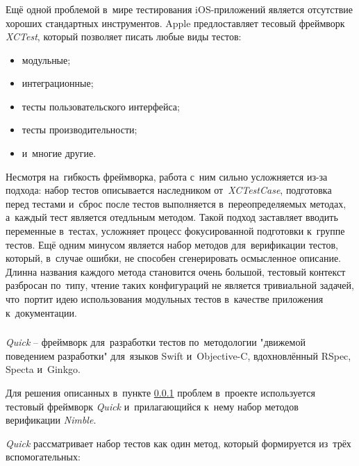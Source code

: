 \subsubsection{}
\label{sec:testing:tech:xctest}

Ещё одной проблемой в~мире тестирования iOS-приложений является отсутствие хороших стандартных инструментов. Apple предлоставляет тесовый фреймворк \textit{XCTest}, который позволяет писать любые виды тестов:

\begin{itemize}
	\item модульные;
	\item интеграционные;
	\item тесты пользовательского интерфейса;
	\item тесты производительности;
	\item и~многие другие.
\end{itemize}

Несмотря на~гибкость фреймворка, работа с~ним сильно усложняется из-за подхода: набор тестов описывается наследником от~\textit{XCTestCase}, подготовка перед тестами и~сброс после тестов выполняется в~переопределяемых методах, а~каждый тест является отедльным методом. Такой подход заставляет вводить переменные в~тестах, усложняет процесс фокусированной подготовки к~группе тестов. Ещё одним минусом является набор методов для~верификации тестов, который, в~случае ошибки, не способен сгенерировать осмысленное описание. Длинна названия каждого метода становится очень большой, тестовый контекст разбросан по~типу, чтение таких конфигураций не является тривиальной задачей, что~портит идею использования модульных тестов в~качестве приложения к~документации.

\subsubsection{}
\label{sec:testing:tech:quick}
\textit{Quick} -- фреймворк для~разработки тестов по~методологии "движемой поведением разработки" для~языков Swift и~Objective-C, вдохновлённый RSpec, Specta и~Ginkgo\cite{github:quick}.

Для решения описанных в~пункте \ref{sec:testing:tech:xctest} проблем в~проекте используется тестовый фреймворк \textit{Quick} и~прилагающийся к~нему набор методов верификации \textit{Nimble}.

\textit{Quick} рассматривает набор тестов как один метод, который формируется из~трёх вспомогательных:

